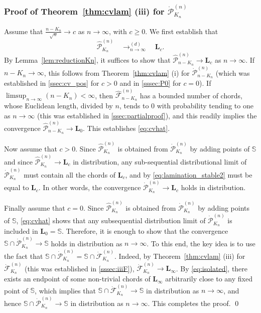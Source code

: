 \documentclass[10pt]{amsart}
\theoremstyle{definition}\newtheorem{defi}[theo]{Definition}\newtheorem{rema}[theo]{Remark}\newtheorem{exam}[theo]{Example}\newtheorem{exem}[theo]{Example}\newtheorem{nota}[theo]{Notation}
\def\S{\mathbb{S}}
\def\PPP{\mathcal P}
\def\FFF{\mathcal F}
\def\dFKn{\dot{\mathcal{F}}^{(n)}_{K_{n}}}
\def\dPKn{\dot{\mathcal{P}}^{(n)}_{K_{n}}}
\begin{document}
\subsubsection{Proof of  Theorem~\ref{thm:cvlam} (iii) for $ \dPKn$}
\label{sssec:iiiP}
Assume that $ \frac{n-K_{n}}{\sqrt{n}} \rightarrow c$ as $n \rightarrow \infty$, with $c \geq  0$.
We first establish that
\begin{equation}
\label{eq:cvhat} \hat{\PPP}^{(n)}_{K_{n}}  \quad \mathop{\longrightarrow}^{(d)}_{n \rightarrow \infty} \quad \mathbf{L}_{c}.
\end{equation}
By Lemma~\ref{lem:reductionKn}, it suffices to show that $ \hat{\PPP}^{(n)}_{n-K_{n}} \rightarrow \mathbf{L}_{c}$ as $n \rightarrow \infty$. If $n-K_{n} \rightarrow \infty$,  this follows from Theorem~\ref{thm:cvlam} (i) for $\dot{\PPP}^{(n)}_{n-K_{n}}$ (which was established in \cref{ssec:cv_pos} for $c>0$ and in \cref{sssec:P0} for $c=0$). If $ \limsup_{n \rightarrow \infty} (n-K_{n})<\infty$, then   $ \hat{\FFF}^{(n)}_{n-K_{n}}$ has a bounded number of chords, whose Euclidean length, divided by $n$, tends to $0$ with probability tending to one as $n \rightarrow \infty$ (this was established in \cref{ssec:partialproof}), and this readily implies the convergence $ \hat{\PPP}^{(n)}_{n-K_{n}} \rightarrow \mathbf{L}_{0}$. This establishes \eqref{eq:cvhat}.


Now assume that $c>0$. Since $\hat{\mathcal{P}}^{(n)}_{K_{n}}$ is obtained from  $\dPKn$ by adding points of $\S$ and since $\hat{\mathcal{P}}^{(n)}_{K_{n}} \rightarrow \mathbf{L}_{c}$ in distribution, any sub-sequential distributional limit of $\dPKn$ must contain all the chords of $\mathbf{L}_{c}$, and by \eqref{eq:lamination_stable2} must be equal to $\mathbf{L}_{c}$. In other words, the convergence $\dPKn \rightarrow  \mathbf{L}_{c}$ holds in distribution.

Finally assume that $c=0$.  Since $\hat{\mathcal{P}}^{(n)}_{K_{n}}$ is obtained from  $\dPKn$ by adding points of $\S$, \eqref{eq:cvhat} shows that any subsequential distribution limit of $\dPKn$ is included in $\mathbf{L}_{0}=\S$. Therefore, it is enough to show that the convergence $\S \cap \dPKn \rightarrow \S$  holds in distribution as $n \rightarrow \infty$. To this end, the key idea is to use the fact that $\S \cap \dPKn=\S \cap \dFKn$. Indeed, by  Theorem~\ref{thm:cvlam} (iii) for $ \dFKn$ (this was established in \cref{sssec:iiiF}), $\dot{\mathcal{F}}^{(n)}_{K_{n}} \rightarrow \mathbf{L}_{\infty}$. By \eqref{eq:isolated},
there exists an endpoint of some non-trivial chords of $\mathbf{L}_{\infty}$ arbitrarily close to any fixed point of $\S$,
which implies that   $\S \cap \dot{\mathcal{F}}^{(n)}_{K_{n}} \rightarrow \S$ in distribution as $n \rightarrow \infty$, and hence  $\S \cap \dot{\mathcal{P}}^{(n)}_{K_{n}} \rightarrow \S$ in distribution as $n \rightarrow \infty$. This completes the proof.
\qed
\medskip
\end{document}
